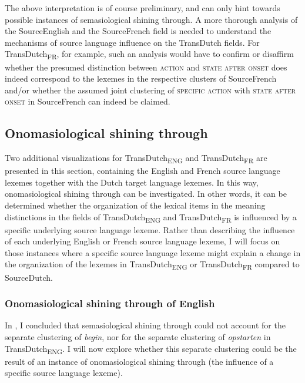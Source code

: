 The above interpretation is of course preliminary, and can only hint towards possible instances of semasiological shining through. A more thorough analysis of the SourceEnglish and the SourceFrench field is needed to understand the mechanisms of source language influence on the TransDutch fields. For TransDutch\textsubscript{FR}, for example, such an analysis would have to confirm or disaffirm whether the presumed distinction between \textsc{action} and \textsc{state after onset} does indeed correspond to the lexemes in the respective clusters of SourceFrench and\slash or whether the assumed joint clustering of {\textsc{specific}} \textsc{action} with \textsc{state after onset} in SourceFrench can indeed be claimed.

\subsection{Onomasiological shining through}
\label{sec:4.6.2}  
Two additional visualizations for TransDutch\textsubscript{ENG} and TransDutch\textsubscript{FR} are presented in this section, containing the English and French source language lexemes together with the Dutch target language lexemes. In this way, onomasiological shining through can be investigated. In other words, it can be determined whether the organization of the lexical items in the meaning distinctions in the fields of TransDutch\textsubscript{ENG} and TransDutch\textsubscript{FR} is influenced by a specific underlying source language lexeme. Rather than describing the influence of each underlying English or French source language lexeme, I will focus on those instances where a specific source language lexeme might explain a change in the organization of the lexemes in TransDutch\textsubscript{ENG} or TransDutch\textsubscript{FR} compared to SourceDutch.


\subsubsection{Onomasiological shining through of English}
\label{sec:4.6.2.1}  
In , I concluded that semasiological shining through could not account for the separate clustering of \textit{begin}, nor for the separate clustering of \textit{opstarten} in TransDutch\textsubscript{ENG}. I will now explore whether this separate clustering could be the result of an instance of onomasiological shining through (the influence of a specific source language lexeme).


